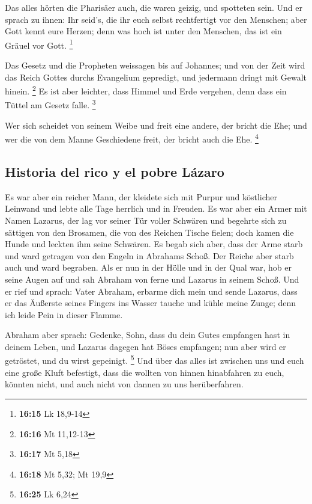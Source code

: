  Das alles hörten die Pharisäer auch, die waren geizig,
und spotteten sein.  Und er sprach zu ihnen: Ihr seid's,
die ihr euch selbst rechtfertigt vor den Menschen; aber Gott kennt eure
Herzen; denn was hoch ist unter den Menschen, das ist ein Gräuel vor
Gott. \footnote{\textbf{16:15} Lk 18,9-14}

 Das Gesetz und die Propheten weissagen bis auf Johannes;
und von der Zeit wird das Reich Gottes durchs Evangelium gepredigt, und
jedermann dringt mit Gewalt hinein. \footnote{\textbf{16:16} Mt 11,12-13}
 Es ist aber leichter, dass Himmel und Erde vergehen,
denn dass ein Tüttel am Gesetz falle. \footnote{\textbf{16:17} Mt 5,18}

 Wer sich scheidet von seinem Weibe und freit eine
andere, der bricht die Ehe; und wer die von dem Manne Geschiedene freit,
der bricht auch die Ehe. \footnote{\textbf{16:18} Mt 5,32; Mt 19,9}

\hypertarget{historia-del-rico-y-el-pobre-luxe1zaro}{%
\subsection{Historia del rico y el pobre
Lázaro}\label{historia-del-rico-y-el-pobre-luxe1zaro}}

 Es war aber ein reicher Mann, der kleidete sich mit
Purpur und köstlicher Leinwand und lebte alle Tage herrlich und in
Freuden.  Es war aber ein Armer mit Namen Lazarus, der
lag vor seiner Tür voller Schwären  und begehrte sich zu
sättigen von den Brosamen, die von des Reichen Tische fielen; doch kamen
die Hunde und leckten ihm seine Schwären.  Es begab sich
aber, dass der Arme starb und ward getragen von den Engeln in Abrahams
Schoß. Der Reiche aber starb auch und ward begraben.  Als
er nun in der Hölle und in der Qual war, hob er seine Augen auf und sah
Abraham von ferne und Lazarus in seinem Schoß.  Und er
rief und sprach: Vater Abraham, erbarme dich mein und sende Lazarus,
dass er das Äußerste seines Fingers ins Wasser tauche und kühle meine
Zunge; denn ich leide Pein in dieser Flamme.

 Abraham aber sprach: Gedenke, Sohn, dass du dein Gutes
empfangen hast in deinem Leben, und Lazarus dagegen hat Böses empfangen;
nun aber wird er getröstet, und du wirst gepeinigt. \footnote{\textbf{16:25}
  Lk 6,24}  Und über das alles ist zwischen uns und euch
eine große Kluft befestigt, dass die wollten von hinnen hinabfahren zu
euch, könnten nicht, und auch nicht von dannen zu uns herüberfahren.


